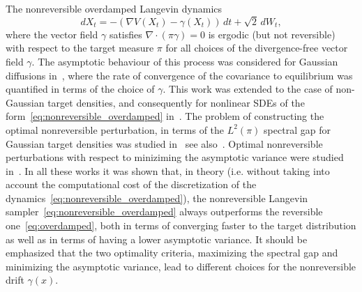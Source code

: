 The nonreversible overdamped Langevin dynamics 
\begin{equation}
\label{eq:nonreversible_overdamped}
	dX_t = -\left(\nabla V(X_t) - \gamma(X_t)\right)\,dt + \sqrt{2}\,dW_t,
\end{equation}
where the vector field $\gamma$ satisfies $\nabla\cdot(\pi \gamma) = 0$ is ergodic (but not reversible) with respect to the target measure $\pi$ for all choices of the divergence-free vector field $\gamma$.  The asymptotic behaviour of this process was considered for Gaussian diffusions in~\cite{Hwang1993}, where the rate of convergence of the covariance to equilibrium was quantified in terms of the choice of $\gamma$. This work was extended to the case of non-Gaussian target densities, and consequently for nonlinear SDEs of the form~\eqref{eq:nonreversible_overdamped} in~\cite{Hwang2005}. The problem of constructing the optimal nonreversible perturbation, in terms of the $L^2(\pi)$ spectral gap for Gaussian target densities was studied in~ \cite{LelievreNierPavliotis2013} see also~\cite{hwang2014}. Optimal nonreversible perturbations with respect to miniziming the asymptotic variance were studied in~\cite{duncan2016variance,asvar_Hwang}. In all these works it was shown that, in theory (i.e. without taking into account the computational cost of the discretization of the dynamics~\eqref{eq:nonreversible_overdamped}), the nonreversible Langevin sampler~\eqref{eq:nonreversible_overdamped} always outperforms the reversible one~\eqref{eq:overdamped}, both in terms of converging faster to the target distribution as well as in terms of having a lower asymptotic variance. It should be emphasized that the two optimality criteria, maximizing the spectral gap and minimizing the asymptotic variance, lead to different choices for the nonreversible drift $\gamma(x)$. 



